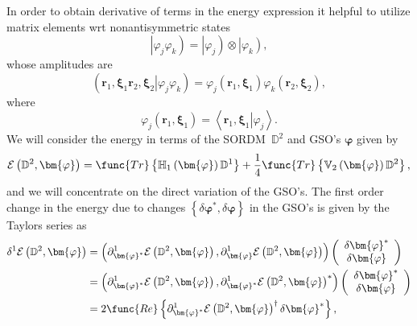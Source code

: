 \documentclass{preprint}
\begin{document}
In order to obtain derivative of terms in the energy expression it helpful
to utilize matrix elements wrt nonantisymmetric states
\begin{equation}
\left\vert \varphi _{j}\varphi _{k}\right) =\left\vert \varphi _{j}\right)
\otimes \left\vert \varphi _{k}\right) ,
\end{equation}%
whose amplitudes are
\begin{equation}
\left( \left. \bm{r}_{1}\bm{,\xi}_{1}\bm{r}_{2}\bm{,\xi}_{2}\right\vert
\varphi _{j}\varphi _{k}\right) =\varphi _{j}\left( \bm{r}_{1}\bm{,\xi}%
_{1}\right) \varphi _{k}\left( \bm{r}_{2}\bm{,\xi}_{2}\right) ,
\end{equation}%
where
\begin{equation}
\varphi _{j}\left( \bm{r}_{1}\bm{,\xi}_{1}\right) =\left\langle \left. \bm{r}%
_{1}\bm{,\xi}_{1}\right\vert \varphi _{j}\right\rangle .
\end{equation}%
We will consider the energy in terms of the SORDM\ $\mathbb{D}^{2}$ and
GSO's $\bm{\varphi}$ given by
\begin{equation}
\mathcal{E}\left( \mathbb{D}^{2},\bm{\varphi}\right) =\func{Tr}\left\{
\mathbb{H}_{1}\left( \bm{\varphi}\right) \mathbb{D}^{1}\right\} +\frac{1}{4}%
\func{Tr}\left\{ \mathbb{V}_{2}\left( \bm{\varphi}\right) \mathbb{D}%
^{2}\right\} ,  \label{e1}
\end{equation}%
and we will concentrate on the direct variation of the GSO's. The first
order change in the energy due to changes $\left\{ \delta \bm{\varphi}^{\ast
},\delta \bm{\varphi}\right\} $ in the GSO's is given by the Taylors series
as
\begin{align}
\delta ^{1}\mathcal{E}\left( \mathbb{D}^{2},\bm{\varphi}\right) & =\left(
\partial _{\bm{\varphi}^{\ast }}^{1}\mathcal{E}\left( \mathbb{D}^{2},%
\bm{\varphi}\right) ,\partial _{\bm{\varphi}}^{1}\mathcal{E}\left( \mathbb{D}%
^{2},\bm{\varphi}\right) \right) \left(
\begin{array}{c}
\delta \bm{\varphi}^{\ast } \\
\delta \bm{\varphi}%
\end{array}%
\right)  \notag \\
& =\left( \partial _{\bm{\varphi}^{\ast }}^{1}\mathcal{E}\left( \mathbb{D}%
^{2},\bm{\varphi}\right) ,\partial _{\bm{\varphi}^{\ast }}^{1}\mathcal{E}%
\left( \mathbb{D}^{2},\bm{\varphi}\right) ^{\ast }\right) \left(
\begin{array}{c}
\delta \bm{\varphi}^{\ast } \\
\delta \bm{\varphi}%
\end{array}%
\right)  \notag \\
& =2\func{Re}\left\{ \partial _{\bm{\varphi}^{\ast }}^{1}\mathcal{E}\left(
\mathbb{D}^{2},\bm{\varphi}\right) ^{\dagger }\delta \bm{\varphi}^{\ast
}\right\} ,
\end{align}%
\end{document}
